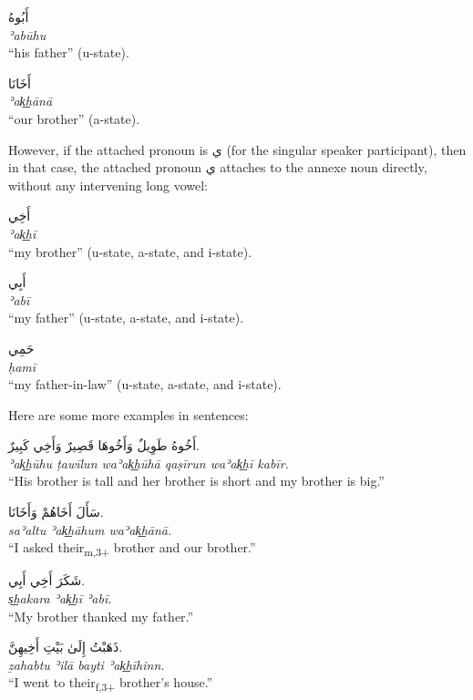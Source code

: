 \documentclass[
  10pt,
]{book}
\begin{document}
\foreignlanguage{arabic}{أَبُوهُ}\\
\emph{ʾabūhu}\\
\enquote{his father} (u-state).

\foreignlanguage{arabic}{أَخَانَا}\\
\emph{ʾak͟hānā}\\
\enquote{our brother} (a-state).

However, if the attached pronoun is \foreignlanguage{arabic}{ي} (for the singular speaker participant), then in that case, the attached pronoun \foreignlanguage{arabic}{ي} attaches to the annexe noun directly, without any intervening long vowel:

\foreignlanguage{arabic}{أَخِي}\\
\emph{ʾak͟hī}\\
\enquote{my brother} (u-state, a-state, and i-state).

\foreignlanguage{arabic}{أَبِي}\\
\emph{ʾabī}\\
\enquote{my father} (u-state, a-state, and i-state).

\foreignlanguage{arabic}{حَمِي}\\
\emph{ḥamī}\\
\enquote{my father-in-law} (u-state, a-state, and i-state).

Here are some more examples in sentences:

\foreignlanguage{arabic}{أَخُوهُ طَوِيلٌ وَأَخُوهَا قَصِيرٌ وَأَخِي کَبِيرٌ.}\\
\emph{ʾak͟hūhu ṭawīlun waʾak͟hūhā qaṣīrun waʾak͟hī kabīr.}\\
\enquote{His brother is tall and her brother is short and my brother is big.}

\foreignlanguage{arabic}{سَأَلَ أَخَاهُمْ وَأَخَانَا.}\\
\emph{saʾaltu ʾak͟hāhum waʾak͟hānā.}\\
\enquote{I asked their\textsubscript{m,3+} brother and our brother.}

\foreignlanguage{arabic}{شَکَرَ أَخِي أَبِي.}\\
\emph{s͟hakara ʾak͟hī ʾabī.}\\
\enquote{My brother thanked my father.}

\foreignlanguage{arabic}{ذَهَبْتُ إِلَىٰ بَيْتِ أَخِيهِنَّ.}\\
\emph{ẕahabtu ʾilā bayti ʾak͟hīhinn.}\\
\enquote{I went to their\textsubscript{f,3+} brother's house.}
\end{document}
